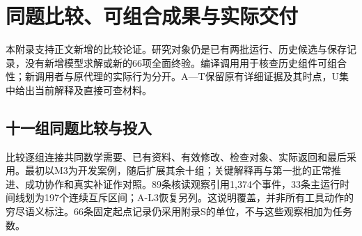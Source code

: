 \section[同题比较、可组合成果与实际交付]{\texorpdfstring{\protect\hypertarget{appendix-u}{}同题比较、可组合成果与实际交付}{同题比较、可组合成果与实际交付}}
本附录支持正文新增的比较论证。研究对象仍是已有两批运行、历史候选与保存记录，没有新增模型求解或新的66项全面终验。编译调用用于核查历史组件可组合性；新调用者与原代理的实际行为分开。A—T保留原有详细证据及其时点，U集中给出当前解释及直接可查材料。

\subsection[十一组同题比较与投入]{\texorpdfstring{\protect\hypertarget{u1}{}十一组同题比较与投入}{十一组同题比较与投入}}
比较逐组连接共同数学需要、已有资料、有效修改、检查对象、实际返回和最后采用。最初以M3为开发案例，随后扩展其余十组；关键解释再与第一批的正常推进、成功协作和真实补证作对照。89条核读观察引用1,374个事件，33条主运行时间线划为197个连续互斥区间；A-L3恢复另列。这说明覆盖，并非所有工具动作的穷尽语义标注。66条固定起点记录仍采用附录S的单位，不与这些观察相加为任务数。

